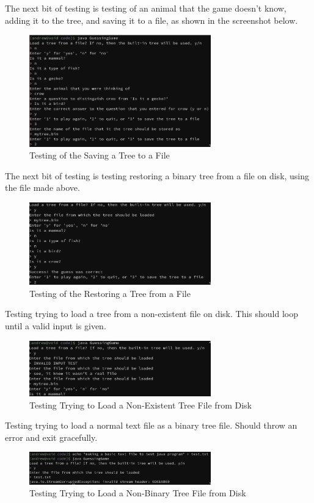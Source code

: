 \documentclass[a4paper]{article}
\begin{document}
The next bit of testing is testing of an animal that the game doesn't know, adding it to the tree, and saving it to a file, as shown in the screenshot below.
\begin{figure}[h]
    \centering \includegraphics[width=0.7\textwidth]{./images/saving.png}
    \caption{Testing of the Saving a Tree to a File}
\end{figure}

\newpage
The next bit of testing is testing restoring a binary tree from a file on disk, using the file made above.
\begin{figure}[h]
    \centering \includegraphics[width=0.7\textwidth]{./images/restore.png}
    \caption{Testing of the Restoring a Tree from a File}
\end{figure}

Testing trying to load a tree from a non-existent file on disk. This should loop until a valid input is given.
\begin{figure}[h]
    \centering \includegraphics[width=0.7\textwidth]{./images/invalidtree.png}
    \caption{Testing Trying to Load a Non-Existent Tree File from Disk}
\end{figure}

Testing trying to load a normal text file as a binary tree file. 
Should throw an error and exit gracefully.
\begin{figure}[h]
    \centering \includegraphics[width=0.7\textwidth]{./images/faketree.png}
    \caption{Testing Trying to Load a Non-Binary Tree File from Disk}
\end{figure}
\end{document}
